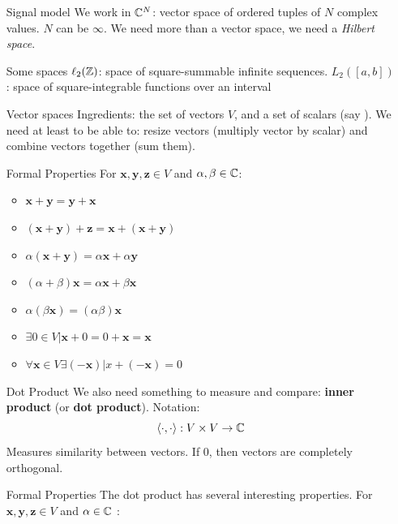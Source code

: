 \documentclass[11pt,a4paper]{article}
\begin{document}
\begin{itemize}[font=\bfseries\uline]
    \item[Signal model]We work in $\mathbb{C}^N$: vector space  of ordered tuples of $N$ complex values. $N$ can be $\infty$. We need more than a vector space, we need a \textit{Hilbert space}.
    \item[Some spaces] $\ell_2(\mathbb{Z})$: space of square-summable infinite sequences. $L_2([a,b])$: space of square-integrable functions over an interval
    \item[Vector spaces]Ingredients: the set of vectors $V$, and a set of scalars (say \C). We need at least to be able to: resize vectors (multiply vector by scalar) and combine vectors together (sum them).
    \item[Formal Properties]For $\mathbf{x},\mathbf{y},\mathbf{z} \in V$ and $\alpha,\beta \in \mathbb{C}$:
        \begin{multicols}{2}
            \begin{itemize}
                \item $\mathbf{x}+\mathbf{y} = \mathbf{y}+\mathbf{x}$
                \item $(\mathbf{x}+\mathbf{y}) + \mathbf{z} = \mathbf{x}+(\mathbf{x}+\mathbf{y})$
                \item $\alpha(\mathbf{x}+\mathbf{y}) = \alpha\mathbf{x} + \alpha\mathbf{y}$
                \item $(\alpha+ \beta)\mathbf{x} = \alpha\mathbf{x} + \beta\mathbf{x}$
                \item $\alpha(\beta\mathbf{x}) = (\alpha\beta)\mathbf{x}$
                \item $\exists 0 \in V | \mathbf{x} + 0 = 0+\mathbf{x} = \mathbf{x}$
                \item $\forall \mathbf{x} \in V \exists(-\mathbf{x}) | x+(- \mathbf{x}) = 0$
            \end{itemize}
        \end{multicols}
    \item[Dot Product]We also need something to measure and compare: \textbf{inner product} (or \textbf{dot product}). Notation: 
        \[\langle\cdot,\cdot\rangle : V\times V \to \mathbb{C}\]
        Measures similarity between vectors. If 0, then vectors are completely orthogonal.
    \item[Formal Properties]The dot product has several interesting properties. For $\mathbf{x},\mathbf{y},\mathbf{z} \in V$ and $\alpha\in\mathbb{C}$ :
    \begin{multicols}{2}
        \begin{itemize}

\end{itemize}
\end{multicols}
\end{itemize}
\end{document}

